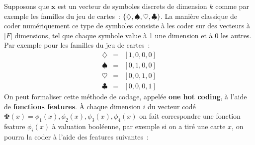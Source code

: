 \documentclass[11pt,openany]{book}
\newcommand{\kw}[1]{{\bf #1}} %
\begin{document}
Supposons que $\mathbf{x}$ est un vecteur de symboles
discrets de dimension $k$ comme par exemple les familles du jeu de
cartes~: $\{\diamondsuit ,\spadesuit ,\heartsuit , \clubsuit \}$. La
manière classique de coder numériquement ce type de symboles consiste
à les coder sur des vecteurs à $|F|$ dimensions, tel que chaque
symbole value à 1 une dimension et à 0 les autres. Par exemple pour les
familles du jeu de cartes~:
\begin{eqnarray*}
\diamondsuit &=& [1,0,0,0]\\
\spadesuit &=& [0,1,0,0]\\
\heartsuit &=& [0,0,1,0]\\
\clubsuit &=& [0,0,0,1]
\end{eqnarray*}
On peut formaliser cette méthode de codage, appelée \kw{one hot
  coding}, à l'aide de \kw{fonctions features}. \`A chaque dimension $i$
du vecteur codé $\boldsymbol\Phi(x) = \phi_1(x),\phi_2(x),\phi_3(x),\phi_4(x)$ on fait correspondre une
fonction feature $\phi_i(x)$ à valuation booléenne, par
exemple si on a tiré une carte $x$, on pourra la coder à l'aide des
features suivantes~:
\begin{center}
\vspace{-0.75cm}
\end{center}
\end{document}

